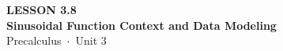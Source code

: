 \documentclass[aspectratio=169, 11pt]{beamer}
\begin{document}
{
\begin{frame}[plain]
  \vspace{2.8cm}\hspace{0.55cm}%
  \begin{minipage}{0.9\textwidth}
    {\color{goldacc}\bfseries\small LESSON 3.8}\\[0.5cm]
    {\color{white}\bfseries\LARGE Sinusoidal Function Context and Data Modeling}\\[1.2cm]
    {\color{skymid}\small Precalculus~$\cdot$~Unit 3}
  \end{minipage}
\end{frame}
}

\begin{frame}[t, plain]
\end{frame}
\end{document}
